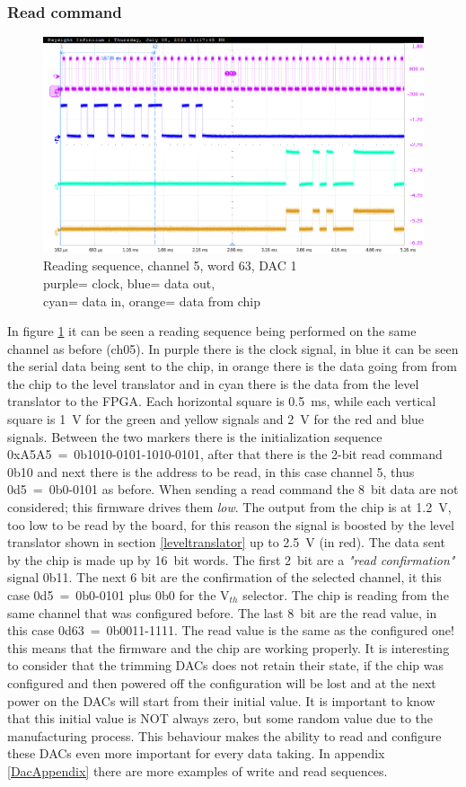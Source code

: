 \subsubsection{Read command}
\begin{figure}[H]
	\centering
	\includegraphics[width=0.7\linewidth]{IMG/ch5/probe/09-08-2021_ch05-read63-baselinedac1}
	\caption{Reading sequence, channel 5, word 63, DAC 1\\{\color{magenta}purple}= clock, {\color{blue}blue}= data out,\\{\color{cyan}cyan}= data in, {\color{orange}orange}= data from chip}
	\label{fig:ch05read63}
\end{figure}
\noindent In figure \ref{fig:ch05read63} it can be seen a reading sequence being performed on the same channel as before (ch05).
In purple there is the clock signal, in blue it can be seen the serial data being sent to the chip, in orange there is the data going from from the chip to the level translator and in cyan there is the data from the level translator to the FPGA.
Each horizontal square is 0.5~ms, while each vertical square is 1~V for the green and yellow signals and 2~V for the red and blue signals.
Between the two markers there is the initialization sequence 0xA5A5~=~0b1010-0101-1010-0101, after that there is the 2-bit read command 0b10 and next there is the address to be read, in this case channel 5, thus 0d5~=~0b0-0101 as before.
When sending a read command the 8~bit data are not considered; this firmware drives them \textit{low}.
The output from the chip is at 1.2~V, too low to be read by the board, for this reason the signal is boosted by the level translator shown in section \ref{leveltranslator} up to 2.5~V (in red).
The data sent by the chip is made up by 16~bit words. The first 2~bit are a \textit{"read confirmation"} signal 0b11. The next 6 bit are the confirmation of the selected channel, it this case 0d5~=~0b0-0101 plus 0b0 for the V$_{th}$ selector.
The chip is reading from the same channel that was configured before.
The last 8~bit are the read value, in this case 0d63~=~0b0011-1111.
The read value is the same as the configured one! this means that the firmware and the chip are working properly.
It is interesting to consider that the trimming DACs does not retain their state, if the chip was configured and then powered off the configuration will be lost and at the next power on the DACs will start from their initial value.
It is important to know that this initial value is NOT always zero, but some random value due to the manufacturing process.
This behaviour makes the ability to read and configure these DACs even more important for every data taking. In appendix \ref{DacAppendix} there are more examples of write and read sequences. 
